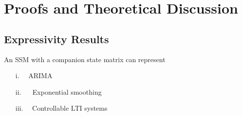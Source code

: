 \section{Proofs and Theoretical Discussion}\label{appendix:theory}
%

\subsection{Expressivity Results}\label{appendix:companion_expressivity}
%
%
\begin{p1}
An SSM with a companion state matrix can represent
    \begin{itemize}[leftmargin=0.4in]
        \item[i.] \fcircle[fill=green!30]{3pt}~~ARIMA \citep{box1970time}
        \item[ii.] \fcircle[fill=red!30]{3pt}~~ Exponential smoothing
        \item[iii.] \fcircle[fill=blue!30]{3pt}~~Controllable LTI systems \citep{chen1984linear}
    \end{itemize}
\end{p1}
%
